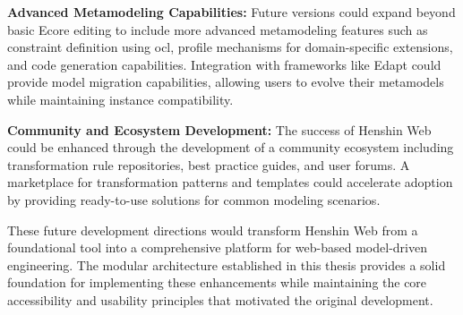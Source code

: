  \textbf{Advanced Metamodeling Capabilities:} Future versions could expand beyond basic Ecore editing to include more advanced metamodeling features such as constraint definition using \ac{ocl}, profile mechanisms for domain-specific extensions, and code generation capabilities. Integration with frameworks like Edapt could provide model migration capabilities, allowing users to evolve their metamodels while maintaining instance compatibility.

  \textbf{Community and Ecosystem Development:} The success of Henshin Web could be enhanced through the development of a community ecosystem including transformation rule repositories, best practice guides, and user forums. A marketplace for transformation patterns and templates could accelerate adoption by providing ready-to-use solutions for common modeling scenarios.

  These future development directions would transform Henshin Web from a foundational tool into a comprehensive platform for web-based model-driven engineering. The modular architecture established in this thesis provides a solid foundation for implementing these enhancements while maintaining the core accessibility and usability principles that motivated the original development.